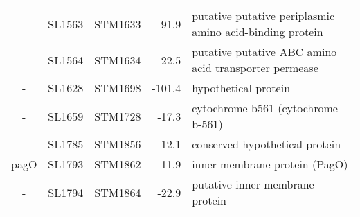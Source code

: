 \begin{table}
\begin{tabular}{ c
    				c
				c
				r
				l
				}
    -     & SL1563 & STM1633 & -91.9 & putative putative periplasmic amino acid-binding protein \\
    -     & SL1564 & STM1634 & -22.5 & putative putative ABC amino acid transporter permease \\
    -     & SL1628 & STM1698 & -101.4 & hypothetical protein \\
    -     & SL1659 & STM1728 & -17.3 & cytochrome b561 (cytochrome b-561) \\
    -     & SL1785 & STM1856 & -12.1 & conserved hypothetical protein \\
    pagO  & SL1793 & STM1862 & -11.9 & inner membrane protein (PagO) \\
    -     & SL1794 & STM1864 & -22.9 & putative inner membrane protein \\
    \bottomrule
    \end{tabular}%
    \label{tab:hns}%
\end{table}

